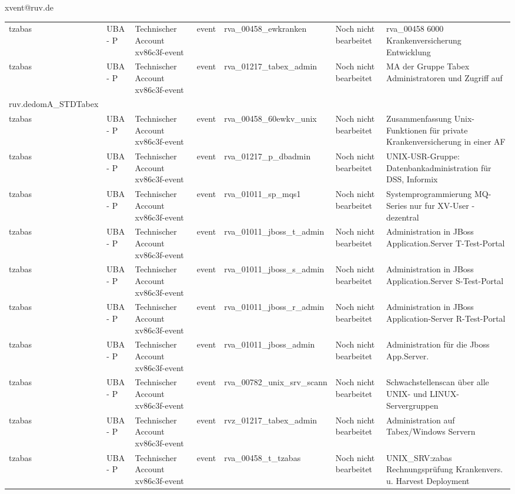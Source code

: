 \documentclass[a4paper,landscape,12pt]{letter}
\begin{document}
\begin{letter}{xvent@ruv.de\hfill \break}
\begin{tiny}
\begin{longtable}{|p{35mm}|p{15mm}|p{25mm}|p{10mm}|p{40mm}|p{50mm}|p{50mm}|}
tzabas & UBA - P & Technischer Account xv86c3f-event & event & rva\_00458\_ewkranken & Noch nicht bearbeitet & rva\_00458 6000 Krankenversicherung Entwicklung \\
tzabas & UBA - P & Technischer Account xv86c3f-event & event & rva\_01217\_tabex\_admin & Noch nicht bearbeitet & MA der Gruppe Tabex Administratoren und Zugriff auf \\ruv.dedomA\_STDTabex \\
tzabas & UBA - P & Technischer Account xv86c3f-event & event & rva\_00458\_60ewkv\_unix & Noch nicht bearbeitet & Zusammenfassung Unix-Funktionen für private Krankenversicherung in einer AF \\
tzabas & UBA - P & Technischer Account xv86c3f-event & event & rva\_01217\_p\_dbadmin & Noch nicht bearbeitet & UNIX-USR-Gruppe: Datenbankadministration für  DSS, Informix \\
tzabas & UBA - P & Technischer Account xv86c3f-event & event & rva\_01011\_sp\_mqs1 & Noch nicht bearbeitet & Systemprogrammierung MQ-Series nur fur XV-User - dezentral \\
tzabas & UBA - P & Technischer Account xv86c3f-event & event & rva\_01011\_jboss\_t\_admin & Noch nicht bearbeitet & Administration in JBoss Application.Server T-Test-Portal \\
tzabas & UBA - P & Technischer Account xv86c3f-event & event & rva\_01011\_jboss\_s\_admin & Noch nicht bearbeitet & Administration in JBoss Application.Server S-Test-Portal \\
tzabas & UBA - P & Technischer Account xv86c3f-event & event & rva\_01011\_jboss\_r\_admin & Noch nicht bearbeitet & Administration in JBoss Application-Server R-Test-Portal \\
tzabas & UBA - P & Technischer Account xv86c3f-event & event & rva\_01011\_jboss\_admin & Noch nicht bearbeitet & Administration für die Jboss App.Server. \\
tzabas & UBA - P & Technischer Account xv86c3f-event & event & rva\_00782\_unix\_srv\_scann & Noch nicht bearbeitet & Schwachstellenscan über alle UNIX- und LINUX-Servergruppen \\
tzabas & UBA - P & Technischer Account xv86c3f-event & event & rvz\_01217\_tabex\_admin & Noch nicht bearbeitet & Administration auf Tabex/Windows Servern \\
tzabas & UBA - P & Technischer Account xv86c3f-event & event & rva\_00458\_t\_tzabas & Noch nicht bearbeitet & UNIX\_SRV:zabas Rechnungsprüfung Krankenvers. u. Harvest Deployment \\

\end{longtable}
\end{tiny}
\end{letter}
\end{document}
